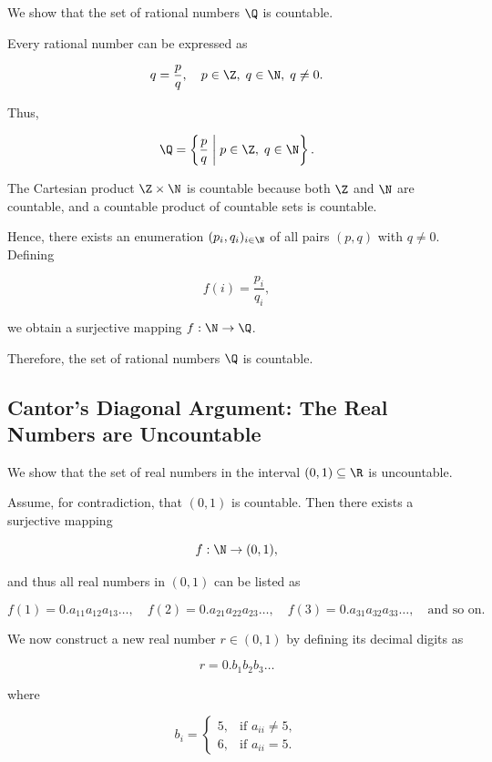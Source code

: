 We show that the set of rational numbers \( \Q \) is countable.

Every rational number can be expressed as

\[
    q = \frac{p}{q}, \quad p \in \Z, \; q \in \N, \; q \neq 0.
\]

Thus,

\[
    \Q = \left\{ \frac{p}{q} \; \middle| \; p \in \Z, \; q \in \N \right\}.
\]

The Cartesian product \( \Z \times \N \) is countable because both \( \Z \) and \( \N \) are countable, and a countable product of countable sets is countable.

Hence, there exists an enumeration \( (p_i, q_i)_{i \in \N} \) of all pairs \( (p, q) \) with \( q \neq 0 \).  
Defining

\[
    f(i) = \frac{p_i}{q_i},
\]

we obtain a surjective mapping \( f : \N \to \Q \).  

Therefore, the set of rational numbers \( \Q \) is countable.

\QED 

\subsection{Cantor's Diagonal Argument: The Real Numbers are Uncountable}

We show that the set of real numbers in the interval \( (0,1) \subseteq \R \) is uncountable.

Assume, for contradiction, that \( (0,1) \) is countable.  
Then there exists a surjective mapping  

\[
    f : \N \to (0,1),
\]

and thus all real numbers in \( (0,1) \) can be listed as

\[
    f(1) = 0.a_{11}a_{12}a_{13}\ldots, \quad
    f(2) = 0.a_{21}a_{22}a_{23}\ldots, \quad
    f(3) = 0.a_{31}a_{32}a_{33}\ldots, \quad \text{and so on.}
\]

We now construct a new real number \( r \in (0,1) \) by defining its decimal digits as

\[
    r = 0.b_1 b_2 b_3 \ldots
\]

where

\[
    b_i =
    \begin{cases}
        5, & \text{if } a_{ii} \neq 5, \\
        6, & \text{if } a_{ii} = 5.
    \end{cases}
\]

